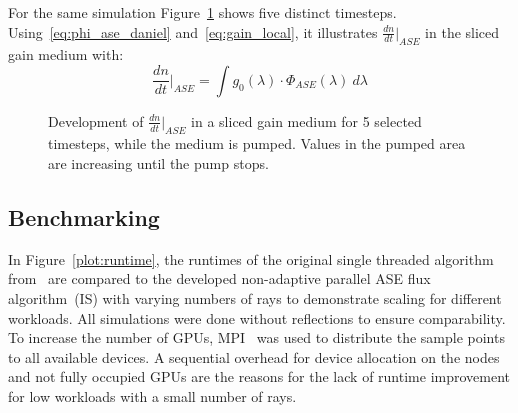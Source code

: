 For the same simulation Figure~\ref{graphic:benchmark_4_timeslices}
shows five distinct timesteps.  Using~\eqref{eq:phi_ase_daniel}
and~\eqref{eq:gain_local}, it illustrates ${\frac{dn}{dt}|}_{ASE}$ in
the sliced gain medium with:
\begin{equation}
  \label{eq:dndt}
  \frac{dn}{dt}\bigg|_{ASE} = \int g_0(\lambda) \cdot \Phi_{ASE}(\lambda)~d\lambda
\end{equation}
\begin{figure}[H]
  \centerline{
    }
  \caption{Development of ${\frac{dn}{dt}|}_{ASE}$ in a sliced gain
    medium for 5 selected timesteps, while the medium is
    pumped. Values in the pumped area are increasing until the pump
    stops.}
\label{graphic:benchmark_4_timeslices}
\end{figure}

\subsection{Benchmarking}
\label{subsec:benchmarking}
In Figure~\ref{plot:runtime}, the runtimes of the original single
threaded algorithm from~\cite{ASE2010} are compared to the developed
non-adaptive parallel ASE flux algorithm~(IS) with varying numbers of
rays to demonstrate scaling for different workloads. All simulations
were done without reflections to ensure comparability. To increase the
number of GPUs, MPI~\cite{MPI} was used to distribute the sample
points to all available devices. A sequential overhead for device
allocation on the nodes and not fully occupied GPUs are the reasons
for the lack of runtime improvement for low workloads with a small
number of rays.

